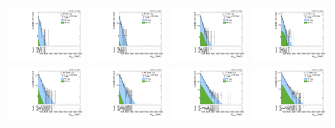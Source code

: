 \begin{figure}[htbp]
  \centering
  \includegraphics[width=0.18\textwidth]{fig/fitValidation/PostFit_SR_MVV_MJJ110to150__mu_HP_bb_LDy_Run2.pdf}
  \includegraphics[width=0.18\textwidth]{fig/fitValidation/PostFit_SR_MVV_MJJ110to150__e_HP_bb_LDy_Run2.pdf}
  \includegraphics[width=0.18\textwidth]{fig/fitValidation/PostFit_SR_MVV_MJJ110to150__mu_LP_bb_LDy_Run2.pdf}
  \includegraphics[width=0.18\textwidth]{fig/fitValidation/PostFit_SR_MVV_MJJ110to150__e_LP_bb_LDy_Run2.pdf}\\
  \includegraphics[width=0.18\textwidth]{fig/fitValidation/PostFit_SR_MVV_MJJ110to150__mu_HP_nobb_LDy_Run2.pdf}
  \includegraphics[width=0.18\textwidth]{fig/fitValidation/PostFit_SR_MVV_MJJ110to150__e_HP_nobb_LDy_Run2.pdf}
  \includegraphics[width=0.18\textwidth]{fig/fitValidation/PostFit_SR_MVV_MJJ110to150__mu_LP_nobb_LDy_Run2.pdf}
  \includegraphics[width=0.18\textwidth]{fig/fitValidation/PostFit_SR_MVV_MJJ110to150__e_LP_nobb_LDy_Run2.pdf}\\

\end{figure}
